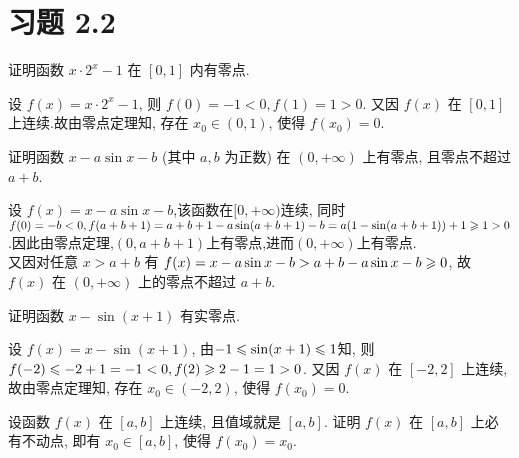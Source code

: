 \section{习题 2.2}

\begin{exercise}[2.2.1]
    证明函数 $x \cdot 2^x - 1$ 在 $[0,1]$ 内有零点.
\end{exercise}

\begin{solution}
    设 $f(x) = x \cdot 2^x - 1$, 则 $f(0) = -1 < 0, f(1) = 1 > 0$. 又因 $f(x)$ 在 $[0,1]$ 上连续.故由零点定理知, 存在 $x_0 \in (0,1)$, 使得 $f(x_0) = 0$.
\end{solution}

\begin{exercise}[2.2.2]
    证明函数 $x - a\sin x - b$ (其中 $a,b$ 为正数) 在 $(0, +\infty)$ 上有零点, 且零点不超过 $a+b$.
\end{exercise}

\begin{solution}
    设 $f(x) = x - a\sin x - b$,该函数在$[0,+\infty)$连续, 同时 $f(0) = -b < 0, f(a+b+1) = a + b + 1 - a\sin(a+b+1) - b = a(1-\sin(a+b+1))+1 \geqslant 1>0$.因此由零点定理,$(0,a+b+1)$上有零点,进而$(0,+\infty)$上有零点.\\
    又因对任意 $x > a+b$ 有 $f(x) = x - a\sin x - b > a + b - a \sin x - b \geqslant 0$, 故 $f(x)$ 在 $(0, +\infty)$ 上的零点不超过 $a+b$.
\end{solution}

\begin{exercise}[2.2.3]
    证明函数 $x - \sin(x+1)$ 有实零点.
\end{exercise}

\begin{solution}
    设 $f(x) = x - \sin(x+1)$, 由$ -1 \leqslant \sin(x+1) \leqslant 1$知,
    则 $f(-2) \leqslant -2 + 1 = -1 < 0, f(2) \geqslant 2 - 1 = 1 > 0$. 又因 $f(x)$ 在 $[-2,2]$ 上连续, 故由零点定理知, 存在 $x_0 \in (-2,2)$, 使得 $f(x_0) = 0$.
\end{solution}

\begin{exercise}[2.2.4]
    设函数 $f(x)$ 在 $[a,b]$ 上连续, 且值域就是 $[a,b]$. 证明 $f(x)$ 在 $[a,b]$ 上必有不动点, 即有 $x_0 \in [a,b]$, 使得 $f(x_0)=x_0$.
\end{exercise}

